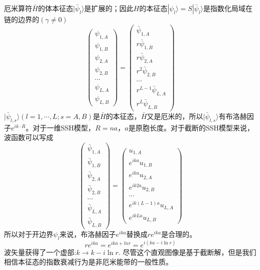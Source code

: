 \documentclass{article}
\begin{document}
厄米算符$\bar{H}$的体本征态$|\bar{\psi}_l\rangle$是扩展的；因此$H$的本征态$|\psi_l\rangle=S|\bar{\psi}_l\rangle$是指数化局域在链的边界的$(\gamma\neq 0)$
\begin{equation}
    \begin{pmatrix}
        \psi_{1,A}\\
        \psi_{1,B}\\
        \psi_{2,A}\\
        \psi_{2,B}\\
        \cdots\\
        \psi_{L,A}\\
        \psi_{L,B}
    \end{pmatrix}=\begin{pmatrix}
        \bar{\psi}_{1,A}\\
        r\bar{\psi}_{1,B}\\
        r\bar{\psi}_{2,A}\\
        r^2\bar{\psi}_{2,B}\\
        \cdots\\
        r^{L-1}\bar{\psi}_{L,A}\\
        r^{L}\bar{\psi}_{L,B}
    \end{pmatrix}
\end{equation}
$|\bar{\psi}_{l,s}\rangle(l=1,\cdots,L;s=A,B)$是$\bar{H}$的本征态，$\bar{H}$又是厄米的，所以$|\bar{\psi}_{l,s}\rangle$有布洛赫因子$e^{ik\cdot R}$。对于一维SSH模型，$R=na$，$a$是原胞长度。对于截断的SSH模型来说，波函数可以写成
\begin{equation}
    \begin{pmatrix}
        \bar{\psi}_{1,A}\\
        \bar{\psi}_{1,B}\\
        \bar{\psi}_{2,A}\\
        \bar{\psi}_{2,B}\\
        \cdots\\
        \bar{\psi}_{L,A}\\
        \bar{\psi}_{L,B}
    \end{pmatrix}=\begin{pmatrix}
        u_{1,A}\\
        e^{ika}u_{1,B}\\
        e^{ika}u_{2,A}\\
        e^{ik2a}u_{2,B}\\
        \cdots\\
        e^{ik(L-1)a}u_{L,A}\\
        e^{ikLa}u_{L,B}
    \end{pmatrix}
\end{equation}
所以对于开边界$\psi_l$来说，布洛赫因子$e^{ika}$替换成$re^{ika}$是合理的。
\begin{equation}
    re^{ika}=e^{ika+lnr}=e^{i(ka-i\ln r)}
\end{equation}
波矢量获得了一个虚部:$k\rightarrow k-i\ln r$. 尽管这个直观图像是基于截断解，但是我们相信本征态的指数衰减行为是非厄米能带的一般性质。
\end{document}
